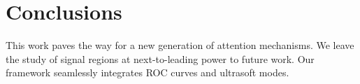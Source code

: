 \section{Conclusions}\label{sec:conclusions}

This work paves the way for a new generation of attention mechanisms. We
leave the study of signal regions at next-to-leading power to future
work. Our framework seamlessly integrates ROC curves and ultrasoft
modes.


